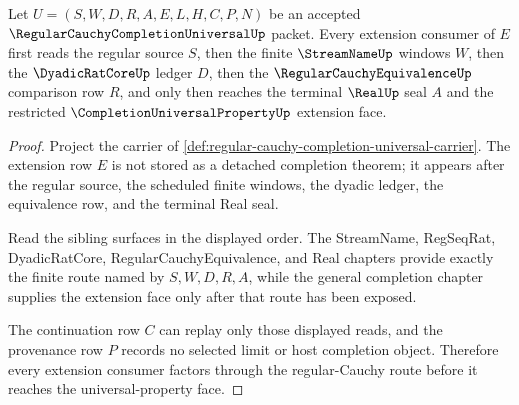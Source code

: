 \begin{theorem}
\label{thm:regular-cauchy-completion-universal-extension-route}
Let $U=(S,W,D,R,A,E,L,H,C,P,N)$ be an accepted $\RegularCauchyCompletionUniversalUp$ packet. Every extension consumer of $E$ first reads the regular source $S$, then the finite $\StreamNameUp$ windows $W$, then the $\DyadicRatCoreUp$ ledger $D$, then the $\RegularCauchyEquivalenceUp$ comparison row $R$, and only then reaches the terminal $\RealUp$ seal $A$ and the restricted $\CompletionUniversalPropertyUp$ extension face.
\end{theorem}
\begin{proof}
Project the carrier of \autoref{def:regular-cauchy-completion-universal-carrier}. The extension row $E$ is not stored as a detached completion theorem; it appears after the regular source, the scheduled finite windows, the dyadic ledger, the equivalence row, and the terminal Real seal.

Read the sibling surfaces in the displayed order. The StreamName, RegSeqRat, DyadicRatCore, RegularCauchyEquivalence, and Real chapters provide exactly the finite route named by $S,W,D,R,A$, while the general completion chapter supplies the extension face only after that route has been exposed.

The continuation row $C$ can replay only those displayed reads, and the provenance row $P$ records no selected limit or host completion object. Therefore every extension consumer factors through the regular-Cauchy route before it reaches the universal-property face.
\end{proof}

